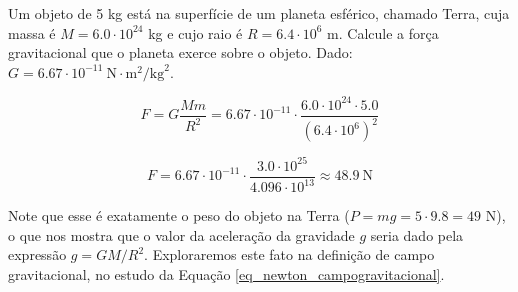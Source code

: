 \vspace{0.3cm}


\begin{exemplo}[Nível I]\label{exemplo_gravitacao_leigravitacaouniversalex01}

Um objeto de 5 kg está na superfície de um planeta esférico, chamado Terra, cuja massa é $M = 6.0 \cdot 10^{24}$ kg e cujo raio é $R = 6.4 \cdot 10^{6}$ m. Calcule a força gravitacional que o planeta exerce sobre o objeto.
Dado: $G = 6.67 \cdot 10^{-11}~\text{N}{\cdot}\text{m}^2/\text{kg}^2$.

\resolucao

\[
  F = G\frac{Mm}{R^2}
    = 6.67 \cdot 10^{-11} \cdot
      \frac{6.0 \cdot 10^{24} \cdot 5.0}{(6.4 \cdot 10^{6})^2}
\]

\[
  F = 6.67 \cdot 10^{-11} \cdot
      \frac{3.0 \cdot 10^{25}}{4.096 \cdot 10^{13}}
    \approx {48.9\ \text{N}}
\]

Note que esse é exatamente o peso do objeto na Terra ($P = mg = 5 \cdot 9.8 = 49$ N), o que nos mostra que o valor da aceleração da gravidade $g$ seria dado pela expressão $g = GM/R^2$. Exploraremos este fato na definição de campo gravitacional, no estudo da Equação \eqref{eq_newton_campogravitacional}.

\end{exemplo}



\vspace{0.3cm}



